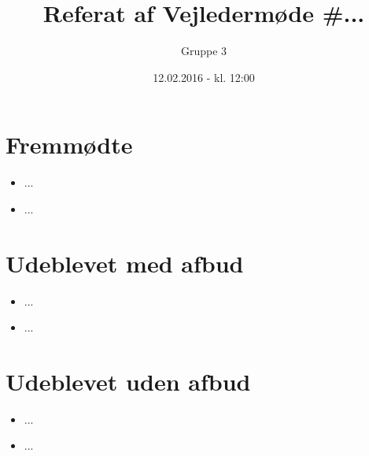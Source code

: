 \documentclass{article}
\title{Referat af Vejledermøde \#...}
\author{Gruppe 3}
\date{12.02.2016 - kl. 12:00}
\begin{document}
	\maketitle
	
	\section{Fremmødte}
	\begin{itemize}
		\item ...
		\item ...
	\end{itemize}
	
	\section{Udeblevet med afbud}
	\begin{itemize}
		\item ...
		\item ...
	\end{itemize}
	
	\section{Udeblevet uden afbud}
	\begin{itemize}
		\item ...
		\item ...
	\end{itemize}
	
\end{document}
